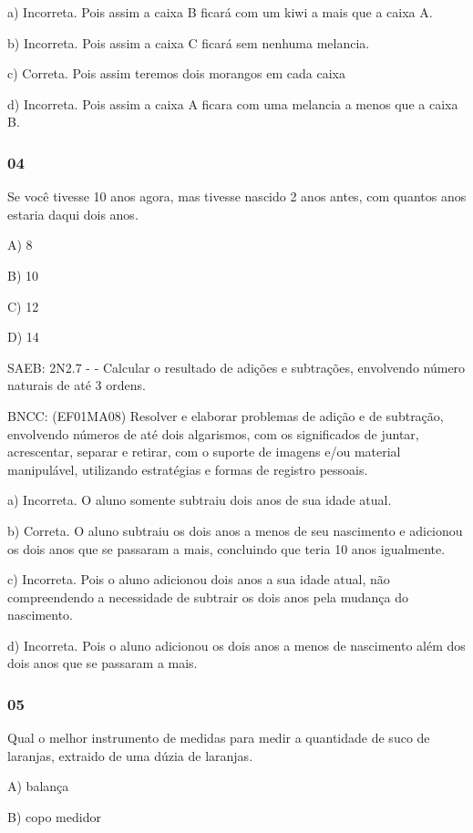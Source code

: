 \begin{itemize}
\begin{itemize}
a) Incorreta. Pois assim a caixa B ficará com um kiwi a mais que a caixa
A.

b) Incorreta. Pois assim a caixa C ficará sem nenhuma melancia.

c) Correta. Pois assim teremos dois morangos em cada caixa

d) Incorreta. Pois assim a caixa A ficara com uma melancia a menos que a
caixa B.

\subsubsection{04}\label{section-135}

Se você tivesse 10 anos agora, mas tivesse nascido 2 anos antes, com
quantos anos estaria daqui dois anos.

A) 8

B) 10

C) 12

D) 14

SAEB: 2N2.7 - - Calcular o resultado de adições e subtrações, envolvendo
número naturais de até 3 ordens.

BNCC: (EF01MA08) Resolver e elaborar problemas de adição e de subtração,
envolvendo números de até dois algarismos, com os significados de
juntar, acrescentar, separar e retirar, com o suporte de imagens e/ou
material manipulável, utilizando estratégias e formas de registro
pessoais.

a) Incorreta. O aluno somente subtraiu dois anos de sua idade atual.

b) Correta. O aluno subtraiu os dois anos a menos de seu nascimento e
adicionou os dois anos que se passaram a mais, concluindo que teria 10
anos igualmente.

c) Incorreta. Pois o aluno adicionou dois anos a sua idade atual, não
compreendendo a necessidade de subtrair os dois anos pela mudança do
nascimento.

d) Incorreta. Pois o aluno adicionou os dois anos a menos de nascimento
além dos dois anos que se passaram a mais.

\subsubsection{05}\label{section-136}

Qual o melhor instrumento de medidas para medir a quantidade de suco de
laranjas, extraido de uma dúzia de laranjas.

A) balança

B) copo medidor


\end{itemize}
\end{itemize}

